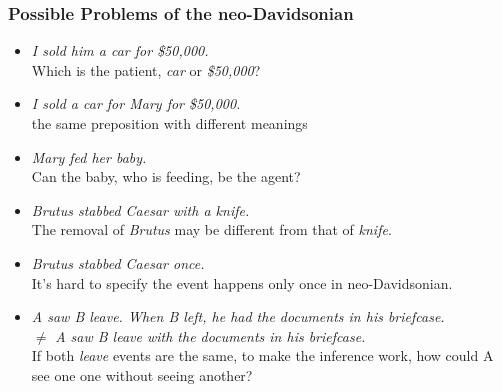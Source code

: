 \documentclass{beamer}
\begin{document}
\begin{frame}
    \frametitle{Possible Problems of the neo-Davidsonian}

    \begin{itemize}
        \item \emph{I sold him \alert{a car} for \alert{\$50,000}.} \\
            Which is the patient, \emph{car} or \emph{\$50,000}?

            \pause

        \item \emph{I sold a car \alert{for} Mary \alert{for} \$50,000.} \\
            the same preposition with different meanings

            \pause

        \item \emph{Mary fed her baby.} \\
            Can the baby, who is \alert{feeding}, be the agent?

            \pause

        \item \emph{\alert{Brutus} stabbed Caesar \alert{with a knife}.} \\
            The removal of \emph{Brutus} may be different from that of \emph{knife}.

            \pause

        \item \emph{Brutus stabbed Caesar \alert{once}.} \\
            It's hard to specify the event happens only once in neo-Davidsonian.

            \pause

        \item \emph{A saw B leave. When B left, he had the documents in his briefcase.}\\
            $\neq$ \emph{A saw B leave with the documents in his briefcase.} \\
            If both \emph{leave} events are the same, to make the inference work,
            how could A see one one without seeing another?
            
    \end{itemize}
\end{frame}
\end{document}
